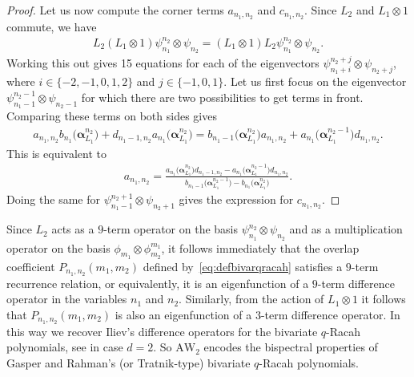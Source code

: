 \documentclass[10pt,a4paper]{amsart}
\numberwithin{equation}{section}
\newcommand{\AW}[1]{\mathrm{AW}_{#1}}
\begin{document}
\begin{proof}
Let us now compute the corner terms $a_{n_1,n_2}$ and $c_{n_1,n_2}$. Since $L_2$ and $L_1\otimes 1$ commute, we have
	\begin{gather*}
		L_2 (L_1\otimes 1) \psi_{n_1}^{n_2}\otimes \psi_{n_2} = (L_1\otimes 1)L_2 \psi_{n_1}^{n_2}\otimes \psi_{n_2}.
	\end{gather*}
	Working this out gives 15 equations for each of the eigenvectors $\psi_{n_1+i}^{n_2+j}\otimes\psi_{n_2+j}$, where $i\in\{-2,-1,0,1,2\}$ and $j\in\{-1,0,1\}$. Let us first focus on the eigenvector $\psi_{n_1-1}^{n_2-1}\otimes\psi_{n_2-1}$ for which there are two possibilities to get terms in front. Comparing these terms on both sides gives
	\begin{gather*}
		a_{n_1,n_2}b_{n_1}\big(\bm{\alpha}_{L_1}^{n_2}\big)+d_{n_1-1,n_2}a_{n_1}\big(\bm{\alpha}_{L_1}^{n_2}\big)= b_{n_1-1}\big(\bm{\alpha}_{L_1}^{n_2}\big)a_{n_1,n_2}+a_{n_1}\big(\bm{\alpha}_{L_1}^{n_2-1}\big)d_{n_1,n_2}.
	\end{gather*}
	This is equivalent to
	\begin{gather*}
		a_{n_1,n_2} = \frac{a_{n_1}\big(\bm{\alpha}_{L_1}^{n_2}\big)d_{n_1-1,n_2}-a_{n_1}\big(\bm{\alpha}_{L_1}^{n_2-1}\big)d_{n_1,n_2}}{b_{n_1-1}\big(\bm{\alpha}_{L_1}^{n_2-1}\big) -b_{n_1}\big(\bm{\alpha}_{L_1}^{n_2}\big)}.
	\end{gather*}
	Doing the same for $\psi_{n_1-1}^{n_2+1}\otimes\psi_{n_2+1}$ gives the expression for $c_{n_1,n_2}$.
\end{proof}

Since $L_2$ acts as a $9$-term operator on the basis $\psi_{n_1}^{n_2} \otimes \psi_{n_2}$ and as a multiplication operator on the basis $\phi_{m_1} \otimes \phi_{m_2}^{m_1}$, it follows immediately that the overlap coefficient $P_{n_1,n_2}(m_1,m_2)$ defined by~\eqref{eq:defbivarqracah}
satisfies a $9$-term recurrence relation, or equivalently, it is an eigenfunction of a $9$-term difference operator in the variables $n_1$ and $n_2$. Similarly, from the action of $L_1\otimes1$ it follows that $P_{n_1,n_2}(m_1,m_2)$ is also an eigenfunction of a $3$-term difference operator. In this way we recover Iliev's difference operators for the bivariate $q$-Racah polynomials, see \cite[Proposition~4.5 and Remark~2.3]{Iliev2011} in case $d=2$. So $\AW{2}$ encodes the bispectral properties of Gasper and Rahman's (or Tratnik-type) bivariate $q$-Racah polynomials.
\end{document}
